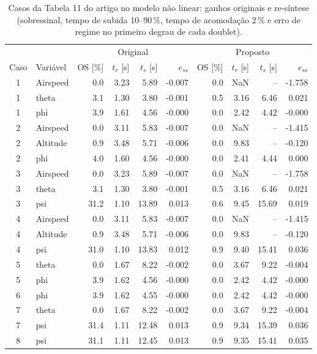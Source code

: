 \begin{table}[htbp]
\centering
\caption{Casos da Tabela 11 do artigo no modelo n\~ao linear: ganhos originais e re-s\'intese (sobressinal, tempo de subida 10--90\,\%, tempo de acomoda\c{c}\~ao 2\,\% e erro de regime no primeiro degrau de cada doublet).}
\label{tab:casos_artigo_orig_v3}
\begin{tabular}{clrrrrrrrr}
\hline
 & & \multicolumn{4}{c}{Original} & \multicolumn{4}{c}{Proposto} \\
Caso & Vari\'avel & OS [\%] & $t_r$ [s] & $t_s$ [s] & $e_{ss}$ & OS [\%] & $t_r$ [s] & $t_s$ [s] & $e_{ss}$ \\
\hline
1 & Airspeed & 0.0 & 3.23 & 5.89 & -0.007 & 0.0 & NaN & -- & -1.758 \\
1 & theta & 3.1 & 1.30 & 3.80 & -0.001 & 0.5 & 3.16 & 6.46 & 0.021 \\
1 & phi & 3.9 & 1.61 & 4.56 & -0.000 & 0.0 & 2.42 & 4.42 & -0.000 \\
2 & Airspeed & 0.0 & 3.11 & 5.83 & -0.007 & 0.0 & NaN & -- & -1.415 \\
2 & Altitude & 0.9 & 3.48 & 5.71 & -0.006 & 0.0 & 9.83 & -- & -0.120 \\
2 & phi & 4.0 & 1.60 & 4.56 & -0.000 & 0.0 & 2.41 & 4.44 & 0.000 \\
3 & Airspeed & 0.0 & 3.23 & 5.89 & -0.007 & 0.0 & NaN & -- & -1.758 \\
3 & theta & 3.1 & 1.30 & 3.80 & -0.001 & 0.5 & 3.16 & 6.46 & 0.021 \\
3 & psi & 31.2 & 1.10 & 13.89 & 0.013 & 0.6 & 9.45 & 15.69 & 0.019 \\
4 & Airspeed & 0.0 & 3.11 & 5.83 & -0.007 & 0.0 & NaN & -- & -1.415 \\
4 & Altitude & 0.9 & 3.48 & 5.71 & -0.006 & 0.0 & 9.83 & -- & -0.120 \\
4 & psi & 31.0 & 1.10 & 13.83 & 0.012 & 0.9 & 9.40 & 15.41 & 0.036 \\
5 & theta & 0.0 & 1.67 & 8.22 & -0.002 & 0.0 & 3.67 & 9.22 & -0.004 \\
5 & phi & 3.9 & 1.62 & 4.56 & -0.000 & 0.0 & 2.42 & 4.42 & -0.000 \\
6 & phi & 3.9 & 1.62 & 4.55 & -0.000 & 0.0 & 2.42 & 4.42 & -0.000 \\
7 & theta & 0.0 & 1.67 & 8.22 & -0.002 & 0.0 & 3.67 & 9.22 & -0.004 \\
7 & psi & 31.4 & 1.11 & 12.48 & 0.013 & 0.9 & 9.34 & 15.39 & 0.036 \\
8 & psi & 31.1 & 1.11 & 12.45 & 0.013 & 0.9 & 9.35 & 15.41 & 0.035 \\
\hline
\end{tabular}
\end{table}
